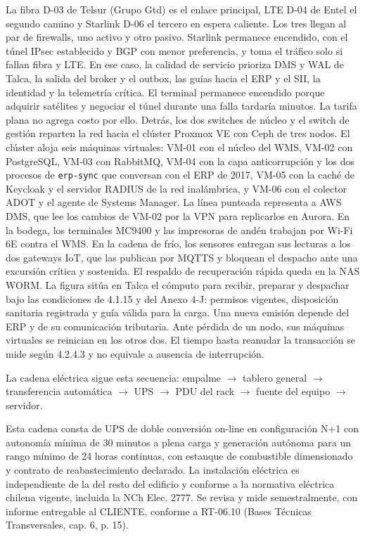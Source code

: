 La fibra D-03 de Telsur (Grupo Gtd) es el enlace principal, LTE D-04 de Entel el segundo camino y Starlink D-06 el tercero en espera caliente. Los tres llegan al par de firewalls, uno activo y otro pasivo. Starlink permanece encendido, con el túnel IPsec establecido y BGP con menor preferencia, y toma el tráfico solo si fallan fibra y LTE. En ese caso, la calidad de servicio prioriza DMS y WAL de Talca, la salida del broker y el outbox, las guías hacia el ERP y el SII, la identidad y la telemetría crítica. El terminal permanece encendido porque adquirir satélites y negociar el túnel durante una falla tardaría minutos. La tarifa plana no agrega costo por ello. Detrás, los dos switches de núcleo y el switch de gestión reparten la red hacia el clúster Proxmox VE con Ceph de tres nodos. El clúster aloja seis máquinas virtuales: VM-01 con el núcleo del WMS, VM-02 con PostgreSQL, VM-03 con RabbitMQ, VM-04 con la capa anticorrupción y los dos procesos de \texttt{erp-sync} que conversan con el ERP de 2017, VM-05 con la caché de Keycloak y el servidor RADIUS de la red inalámbrica, y VM-06 con el colector ADOT y el agente de Systems Manager. La línea punteada representa a AWS DMS, que lee los cambios de VM-02 por la VPN para replicarlos en Aurora. En la bodega, los terminales MC9400 y las impresoras de andén trabajan por Wi-Fi 6E contra el WMS. En la cadena de frío, los sensores entregan sus lecturas a los dos gateways IoT, que las publican por MQTTS y bloquean el despacho ante una excursión crítica y sostenida. El respaldo de recuperación rápida queda en la NAS WORM. La figura sitúa en Talca el cómputo para recibir, preparar y despachar bajo las condiciones de 4.1.15 y del Anexo 4-J: permisos vigentes, disposición sanitaria registrada y guía válida para la carga. Una nueva emisión depende del ERP y de su comunicación tributaria. Ante pérdida de un nodo, sus máquinas virtuales se reinician en los otros dos. El tiempo hasta reanudar la transacción se mide según 4.2.4.3 y no equivale a ausencia de interrupción.

La cadena eléctrica sigue esta secuencia: empalme $\rightarrow$ tablero general $\rightarrow$ transferencia automática $\rightarrow$ UPS $\rightarrow$ PDU del rack $\rightarrow$ fuente del equipo $\rightarrow$ servidor.

Esta cadena consta de UPS de doble conversión on-line en configuración N+1 con autonomía mínima de 30 minutos a plena carga y generación autónoma para un rango mínimo de 24 horas continuas, con estanque de combustible dimensionado y contrato de reabastecimiento declarado. La instalación eléctrica es independiente de la del resto del edificio y conforme a la normativa eléctrica chilena vigente, incluida la NCh Elec. 2777. Se revisa y mide semestralmente, con informe entregable al CLIENTE, conforme a RT-06.10 (Bases Técnicas Transversales, cap. 6, p. 15).

